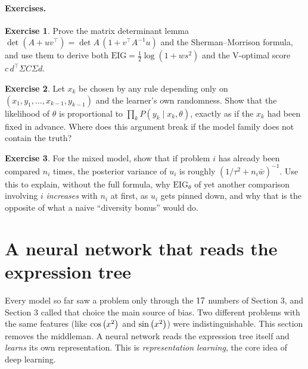\documentclass[11pt]{article}
\theoremstyle{definition}
\newtheorem{exercise}{Exercise}[section]
\theoremstyle{plain}
\theoremstyle{remark}
\renewcommand{\_}{\oldunderscore\allowbreak}
\begin{document}
\paragraph{Exercises.}
\begin{exercise}
Prove the matrix determinant lemma $\det(A+uv^\top)=\det A\,(1+v^\top A^{-1}u)$ and the Sherman--Morrison formula, and use them to derive both
$\mathrm{EIG}=\frac12\log(1+ws^2)$ and the V-optimal score $c\,d^\top\Sigma C\Sigma d$.
\end{exercise}
\begin{exercise}\label{ex:ignorable}
Let $x_k$ be chosen by any rule depending only on $(x_1,y_1,\dots,x_{k-1},y_{k-1})$ and the learner's own randomness. Show that the likelihood of $\theta$ is
proportional to $\prod_kP(y_k\mid x_k,\theta)$, exactly as if the $x_k$ had been fixed in advance. Where does this argument break if the model family does not contain
the truth?
\end{exercise}
\begin{exercise}
For the mixed model, show that if problem $i$ has already been compared $n_i$ times, the posterior variance of $u_i$ is roughly $(1/\tau^2+n_i\bar w)^{-1}$. Use this to
explain, without the full formula, why $\mathrm{EIG}_\theta$ of yet another comparison involving $i$ \emph{increases} with $n_i$ at first, as $u_i$ gets pinned down, and
why that is the opposite of what a naive ``diversity bonus'' would do.
\end{exercise}

\section{A neural network that reads the expression tree}
\label{sec:treenet}

Every model so far saw a problem only through the $17$ numbers of Section 3, and Section 3 called that choice the main source of
bias. Two different problems with the same features (like $\cos\left(x^{2}\right)$ and $\sin\left(x^{2}\right)$) were indistinguishable. This section removes the
middleman. A neural network reads the expression tree itself and \emph{learns} its own representation. This is \emph{representation learning}, the core idea of deep learning.
\end{document}
